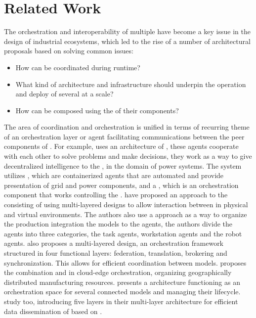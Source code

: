 \chapter{Related Work}
\label{ch:related-work}
The orchestration and interoperability of multiple \DTs have become a key issue in the design of industrial \DT ecosystems, 
which led to the rise of a number of architectural proposals based on solving common issues: 
\begin{itemize}
    \item How \DTs can be coordinated during runtime?
    \item What kind of architecture and infrastructure should underpin the operation and deploy of several \DTs at a scale?
    \item How \DTs can be composed using the \DTs of their components? 
\end{itemize} 
The area of coordination and orchestration is unified in terms of recurring theme of an orchestration layer or agent facilitating 
communications between the peer components of \DTs. For example, \cite{Monsalve2021} uses an architecture of \MAS, 
these agents cooperate with each other to solve problems and make decisions, they work as a way to give decentralized intelligence 
to the \DTs, in the domain of power systems. The system utilizes \DTCs, which are containerized agents that are 
automated and provide presentation of grid and power components, and a \DTM, which is an orchestration component 
that works controlling the \DTCs. \cite{Xu2024} have proposed an approach to the \CDT consisting of using 
multi-layered designs to allow interaction between \DTs in physical and virtual environments. The authors also use a \MAS approach as 
a way to organize the production integration the \DT models to the \MAS agents, the authors divide the agents into three categories, 
the task agents, workstation agents and the robot agents. \cite{Nguyen2024} also proposes a multi-layered design, an orchestration 
framework structured in four functional layers: federation, translation, brokering and synchronization. This allows for efficient 
coordination between \DT models. \cite{Nie2023} proposes the combination \DTs and \MAS in cloud-edge orchestration, organizing 
geographically distributed manufacturing resources. \cite{Pan2025} presents a \DTN architecture functioning 
as an orchestration space for several connected \DT models and managing their lifecycle. \cite{Alhazmi2025} study \DTNs too, 
introducing five layers in their multi-layer architecture for efficient data dissemination of \DTs based on \MQTT.\\
